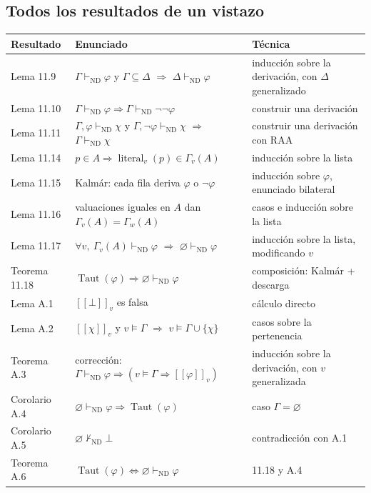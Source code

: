 \documentclass[11pt,a4paper]{article}
\newcommand{\Provnd}{\vdash_{\mathrm{ND}}}
\newcommand{\Not}{\neg}
\newcommand{\sem}[1]{[\![#1]\!]}
\newcommand{\Taut}{\operatorname{Taut}}
\newcommand{\lit}{\operatorname{literal}}
\begin{document}
\subsection*{Todos los resultados de un vistazo}

{\small
\begin{longtable}{@{}p{}p{}p{}@{}}
\toprule
\textbf{Resultado} & \textbf{Enunciado} & \textbf{Técnica}\\
\midrule
\endhead
Lema 11.9 & \(\Gamma\Provnd\varphi\) y \(\Gamma\subseteq\Delta\) \(\Rightarrow\) \(\Delta\Provnd\varphi\) & inducción sobre la derivación, con \(\Delta\) generalizado\\
Lema 11.10 & \(\Gamma\Provnd\varphi\Rightarrow\Gamma\Provnd\Not\Not\varphi\) & construir una derivación\\
Lema 11.11 & \(\Gamma,\varphi\Provnd\chi\) y \(\Gamma,\Not\varphi\Provnd\chi\) \(\Rightarrow\) \(\Gamma\Provnd\chi\) & construir una derivación con RAA\\
Lema 11.14 & \(p\in A\Rightarrow\lit_v(p)\in\Gamma_v(A)\) & inducción sobre la lista\\
Lema 11.15 & Kalmár: cada fila deriva \(\varphi\) o \(\Not\varphi\) & inducción sobre \(\varphi\), enunciado bilateral\\
Lema 11.16 & valuaciones iguales en \(A\) dan \(\Gamma_v(A)=\Gamma_w(A)\) & casos e inducción sobre la lista\\
Lema 11.17 & \(\forall v,\ \Gamma_v(A)\Provnd\varphi\) \(\Rightarrow\) \(\varnothing\Provnd\varphi\) & inducción sobre la lista, modificando \(v\)\\
Teorema 11.18 & \(\Taut(\varphi)\Rightarrow\varnothing\Provnd\varphi\) & composición: Kalmár + descarga\\
\midrule
Lema A.1 & \(\sem{\bot}_v\) es falsa & cálculo directo\\
Lema A.2 & \(\sem\chi_v\) y \(v\models\Gamma\) \(\Rightarrow\) \(v\models\Gamma\cup\{\chi\}\) & casos sobre la pertenencia\\
Teorema A.3 & corrección: \(\Gamma\Provnd\varphi\Rightarrow(v\models\Gamma\Rightarrow\sem\varphi_v)\) & inducción sobre la derivación, con \(v\) generalizada\\
Corolario A.4 & \(\varnothing\Provnd\varphi\Rightarrow\Taut(\varphi)\) & caso \(\Gamma=\varnothing\)\\
Corolario A.5 & \(\varnothing\not\Provnd\bot\) & contradicción con A.1\\
Teorema A.6 & \(\Taut(\varphi)\iff\varnothing\Provnd\varphi\) & 11.18 y A.4\\
\bottomrule
\end{longtable}
}
\end{document}
